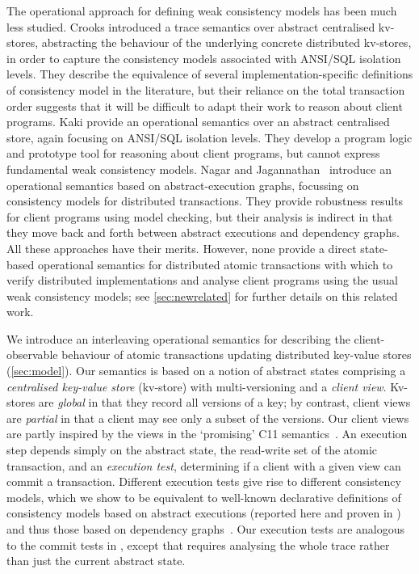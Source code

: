 The operational approach for defining weak consistency models has been
much less studied.  Crooks \etal\citet{seebelieve} introduced
a trace semantics over  abstract centralised
kv-stores,  abstracting the behaviour of the underlying concrete distributed 
kv-stores,  in order  to 
capture the  consistency models associated with ANSI/SQL isolation
levels. 
They describe the equivalence of several
implementation-specific definitions of consistency model in the
literature, but their reliance on the total transaction order 
suggests that it will be difficult to adapt their work to reason about
client programs. Kaki \etal\citet{alonetogether} provide an
operational semantics over an abstract centralised store, again
focusing on ANSI/SQL isolation levels. They develop a program logic
and prototype tool for reasoning about client programs, but cannot
express fundamental weak consistency models. 
Nagar and Jagannathan~\cite{sureshConcur} introduce an operational semantics based on
abstract-execution graphs, focussing on consistency models for
distributed transactions. They provide robustness results for client
programs using model checking, but their analysis is indirect in that
they move back and forth between abstract executions and dependency
graphs. All these approaches have their merits. However, none 
provide a direct state-based operational semantics for distributed
atomic transactions with which to verify distributed implementations
and analyse client programs using the usual weak consistency models; 
see \cref{sec:newrelated} for further details on this related work. 



We introduce an interleaving operational semantics for describing the
client-observable behaviour of atomic transactions 
updating distributed key-value stores  (\cref{sec:model}). Our semantics is
based on a notion of abstract states comprising a \emph{centralised key-value store} (kv-store) with {multi-versioning} and a \emph{client view}.
Kv-stores are {\em global} in that they record all versions of a key; 
by contrast, client views are {\em partial} in that a client may see only a subset of the versions. 
Our client views are partly inspired by the views in the `promising' C11 semantics~\cite{promises}. 
An execution step depends simply on the abstract state, the read-write set of the atomic transaction, and an \emph{execution test}, 
determining if a client with a given view can commit a transaction. Different execution tests give rise to different
consistency models, 
which we show to be equivalent to well-known
declarative definitions of consistency models based on abstract executions 
(reported here and proven in \cite{shale-phd}) and thus those based on dependency graphs~\cite{laws}. 
Our execution tests are analogous to the commit tests in \cite{seebelieve},
except that \cite{seebelieve} requires analysing the whole trace rather than just the current abstract state. 

